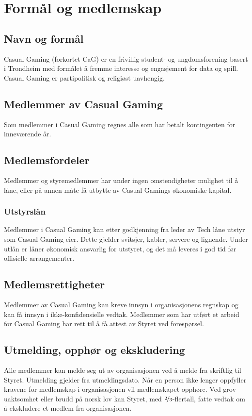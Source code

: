 \chapter{Formål og medlemskap}

\section{Navn og formål}
Casual Gaming (forkortet CaG) er en frivillig student- og ungdomsforening basert i Trondheim med formålet å fremme interesse og engasjement for data og spill. Casual Gaming er partipolitisk og religiøst uavhengig.

\section{Medlemmer av Casual Gaming}
Som medlemmer i Casual Gaming regnes alle som har betalt kontingenten for inneværende år.

\section{Medlemsfordeler}
Medlemmer og styremedlemmer har under ingen omstendigheter mulighet til å låne, eller på annen måte få utbytte av Casual Gamings økonomiske kapital.

\subsection{Utstyrslån}
Medlemmer i Casual Gaming kan etter godkjenning fra leder av Tech låne utstyr som Casual Gaming eier. Dette gjelder svitsjer, kabler, servere og lignende. Under utlån er låner økonomisk ansvarlig for utstyret, og det må leveres i god tid før offisielle arrangementer.

\section{Medlemsrettigheter}
Medlemmer av Casual Gaming kan kreve innsyn i organisasjonens regnskap og kan få innsyn i ikke-konfidensielle vedtak. Medlemmer som har utført et arbeid for Casual Gaming har rett til å få attest av Styret ved forespørsel.

\section{Utmelding, opphør og ekskludering}
Alle medlemmer kan melde seg ut av organisasjonen ved å melde fra skriftlig til Styret. Utmelding gjelder fra utmeldingsdato. Når en person ikke lenger oppfyller kravene for medlemskap i organisasjonen vil medlemskapet opphøre. Ved grov uaktsomhet eller brudd på norsk lov kan Styret, med $\nicefrac{2}{3}$-flertall, fatte vedtak om å ekskludere et medlem fra organisasjonen.
